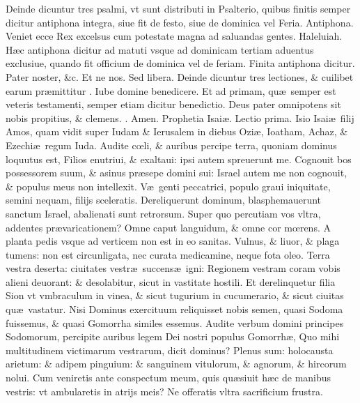 \documentclass[a5paper,10pt]{book}
\def\ae{æ}
\def\oe{œ}
\begin{document}
\begin{multicols*}{2}
Deinde dicuntur tres psalmi, vt sunt distributi in Psalterio, quibus finitis semper dicitur antiphona integra, siue fit de festo, siue de dominica vel Feria. Antiphona. \color{black}
Veniet ecce Rex excelsus cum potestate magna ad saluandas gentes. Haleluiah.
\color{red} H\ae c antiphona dicitur ad matuti vsque ad dominicam tertiam aduentus exclusiue, quando fit officium de dominica vel de feriam. %
Finita antiphona dicitur. \color{black} Pater noster, \&c. Et ne nos. Sed libera. \color{black}
\color{red} Deinde dicuntur tres lectiones, \& cuilibet earum pr\ae mittitur \Vbar . \color{black} Iube domine benedicere.
\color{red} Et ad primam, qu\ae \ semper est veteris testamenti, semper etiam dicitur benedictio. \color{black} Deus pater omnipotens sit nobis propitius, \& clemens. \color{red} \Rbar . \color{black} Amen.
\newline \color{red} Prophetia Isai\ae . \hfill Lectio prima. \color{black}
\vspace{-1em}
Isio Isai\ae \ filij Amos, quam vidit super Iudam \& Ierusalem in diebus Ozi\ae , Ioatham, Achaz, \& Ezechi\ae \ regum Iuda. 
Audite c\oe li, \& auribus percipe terra, quoniam dominus loquutus est, Filios enutriui, \& exaltaui: ipsi autem spreuerunt me.
Cognouit bos possessorem suum, \& asinus pr\ae sepe domini sui: Israel autem me non cognouit, \& populus meus non intellexit.
V\ae \ genti peccatrici, populo graui iniquitate, semini nequam, filijs sceleratis.
Dereliquerunt dominum, blasphemauerunt sanctum Israel, abalienati sunt retrorsum. 
Super quo percutiam vos vltra, addentes pr\ae varicationem?
Omne caput languidum, \& omne cor m\oe rens.
A planta pedis vsque ad verticem non est in eo sanitas.
Vulnus, \& liuor, \& plaga tumens: non est circunligata, nec curata medicamine, neque fota oleo.
Terra vestra deserta: ciuitates vestr\ae \ succens\ae \ igni: Regionem vestram coram vobis alieni deuorant: \& desolabitur, sicut in vastitate hostili. 
Et derelinquetur filia Sion vt vmbraculum in vinea, \& sicut tugurium in cucumerario, \& sicut ciuitas qu\ae \ vastatur.
Nisi Dominus exercituum reliquisset nobis semen, quasi Sodoma fuissemus, \& quasi Gomorrha similes essemus.
Audite verbum domini principes Sodomorum, percipite auribus legem Dei nostri populus Gomorrh\ae , Quo mihi multitudinem victimarum vestrarum, dicit dominus?
Plenus sum: holocausta arietum: \& adipem pinguium: \& sanguinem vitulorum, \& agnorum, \& hircorum nolui.
Cum veniretis ante conspectum meum, quis qu\ae siuit h\ae c de manibus vestris: vt ambularetis in atrijs meis?
Ne offeratis vltra sacrificium frustra.

\end{multicols*}
\end{document}
